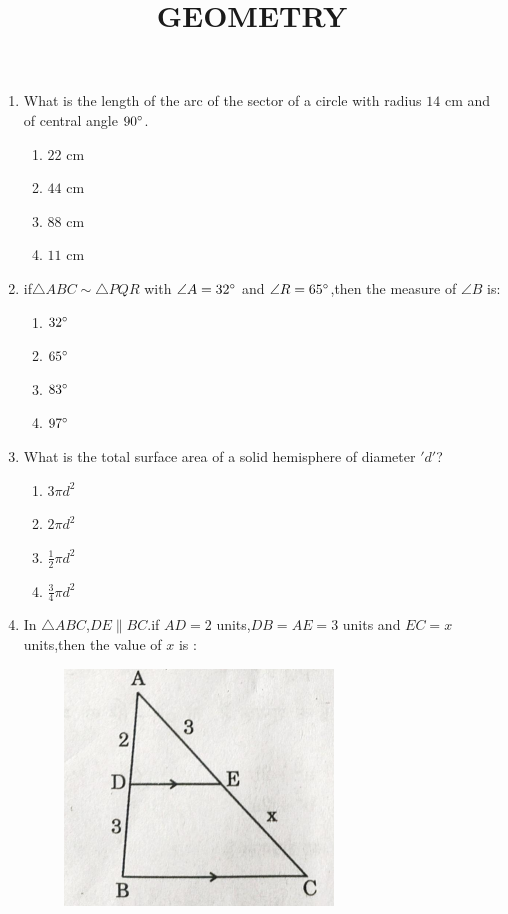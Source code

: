 \documentclass{article}
\title{GEOMETRY}
\begin{document}
\maketitle
\begin{enumerate}
    \item What is the length of the arc of the sector of a circle with radius $14$ cm and of central angle $90\degree$.
    \begin{enumerate}
        \item $22$ cm
        \item $44$ cm
        \item $88$ cm
        \item $11$ cm
    \end{enumerate}
    \item if$\triangle ABC \sim \triangle PQR$ with $\angle A=32\degree$ and $\angle R=65\degree$,then the measure of $\angle B$ is:
    \begin{enumerate}
        \item $32\degree$
        \item $65\degree$
        \item $83\degree$
        \item $97\degree$
    \end{enumerate}
    \item What is the total surface area of a solid hemisphere of diameter $'d'$?
    \begin{enumerate}
        \item $3 \pi d^2$
        \item $2 \pi d^2$
        \item $\frac{1}{2} \pi d^2$
        \item $\frac{3}{4} \pi d^2$
    \end{enumerate}
    \item In $\triangle ABC$,$DE \parallel BC$.if $AD=2$ units,$DB=AE=3$ units and $EC=x$ units,then the value of $x$ is :
    \begin{figure}[!ht]
        \centering
        \includegraphics[width=\columnwidth]{figs/30-2-1-question12.png}

\end{figure}
\end{enumerate}
\end{document}
